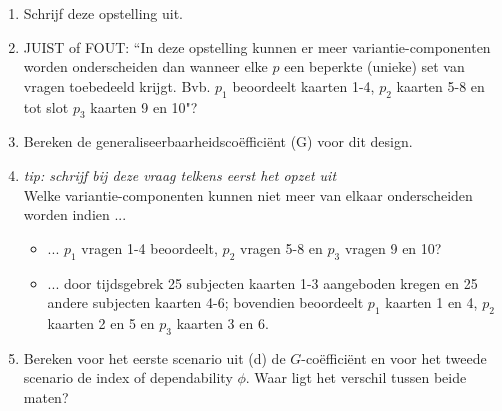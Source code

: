 {\begin{enumerate}
\begin{enumerate}
	\item Schrijf deze opstelling uit.
	\item JUIST of FOUT: ``In deze opstelling kunnen er meer variantie-componenten worden onderscheiden dan wanneer elke $p$ een beperkte (unieke) set van vragen toebedeeld krijgt. Bvb. $p_1$ beoordeelt kaarten 1-4, $p_2$ kaarten 5-8 en tot slot $p_3$ kaarten 9 en 10"?
	\item Bereken de generaliseerbaarheidsco\"{e}ffici\"{e}nt (G) voor dit design.
	\item \emph{tip: schrijf bij deze vraag telkens eerst het opzet uit}\\
	Welke variantie-componenten kunnen niet meer van elkaar onderscheiden worden indien ...
\begin{itemize}
	\item ... $p_1$ vragen 1-4 beoordeelt, $p_2$ vragen 5-8 en $p_3$ vragen 9 en 10?
	\item ... door tijdsgebrek 25 subjecten kaarten 1-3 aangeboden kregen en 25 andere subjecten kaarten 4-6; bovendien beoordeelt $p_1$ kaarten 1 en 4, $p_2$ kaarten 2 en 5 en $p_3$ kaarten 3 en 6.
\end{itemize}
\item Bereken voor het eerste scenario uit (d) de $G$-co\"{e}ffici\"{e}nt en voor het tweede scenario de index of dependability $\phi$. Waar ligt het verschil tussen beide maten?
\end{enumerate}
\end{enumerate}
}

